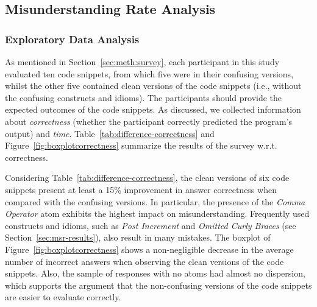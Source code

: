   


\subsection{Misunderstanding Rate Analysis}

\subsubsection*{Exploratory Data Analysis}

As mentioned in Section~\ref{sec:meth:survey}, each participant in this study evaluated ten
code snippets, from which five were in their confusing versions, whilst the other five contained clean versions of the code snippets (i.e., without the confusing constructs and idioms). The participants should provide the expected outcomes of the code snippets. As discussed, we collected information about \emph{correctness} (whether the participant correctly predicted the program's output) and \emph{time}. 
Table~\ref{tab:difference-correctness} and Figure~\ref{fig:boxplotcorrectness} summarize the results of the survey w.r.t. correctness.

Considering Table~\ref{tab:difference-correctness}, the clean versions of six code snippets present at least a 15\% improvement in answer correctness when compared with the confusing versions. In particular, the presence of the \emph{Comma Operator} atom exhibits the highest impact on misunderstanding. 
Frequently used constructs and idioms, such as \emph{Post Increment} and \emph{Omitted Curly Braces} (see Section~\ref{sec:msr-results}), also result in many mistakes. %
The boxplot of Figure~\ref{fig:boxplotcorrectness} shows a non-negligible decrease in the average number of incorrect answers when observing the clean versions of the code snippets. Also, the sample of responses with no atoms had almost no dispersion, which supports the argument that the non-confusing versions of the code snippets are easier to evaluate correctly. 



